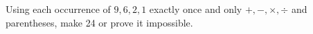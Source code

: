 Using each occurrence of $9,6,2,1$ exactly once and only $+,-,\times,\div$ and parentheses, make 24 or prove it impossible.
